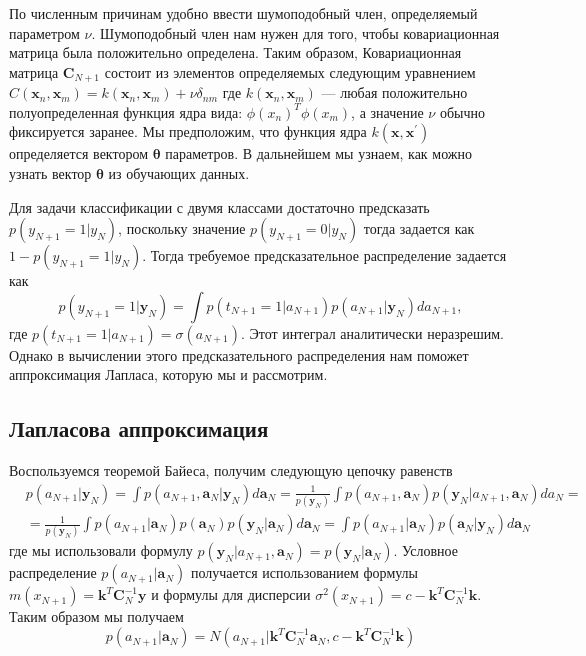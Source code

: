 {По численным причинам удобно ввести шумоподобный член, определяемый
параметром $\nu$. Шумоподобный член нам нужен для того, чтобы ковариационная матрица была положительно определена. Таким образом,
Ковариационная матрица $\mathbf{C}_{N+1}$ состоит из элементов определяемых следующим уравнением $C(\mathbf{x}_n,\mathbf{x}_m)=k(\mathbf{x}_n,\mathbf{x}_m)+\nu\delta_{nm}$
где $k(\mathbf{x}_n,\mathbf{x}_m)$ — любая положительно полуопределенная функция ядра вида: $\phi(x_n)^T\phi(x_m)$, а значение $\nu$ обычно фиксируется заранее. Мы предположим, что
функция ядра $k(\mathbf{x},\mathbf{x}^{\prime})$ определяется вектором $\mathbf{\theta}$ параметров. В дальнейшем мы узнаем, как можно узнать вектор $\mathbf{\theta}$ из обучающих данных.

Для задачи классификации с двумя классами достаточно предсказать $p(y_{N+1} =1|y_{N})$, поскольку
значение $p(y_{N+1} =0|y_{N})$ тогда задается как $1-p(y_{N+1} =1|y_{N})$. Тогда требуемое
предсказательное распределение задается как
\begin{equation}
p(y_{N+1} =1|\mathbf{y}_{N})= \int p(t_{N+1} =1|a_{N+1})p(a_{N+1}|\mathbf{y}_N)da_{N+1},
\end{equation}
где $p(t_{N+1} =1|a_{N+1})=\sigma(a_{N+1})$. Этот интеграл аналитически неразрешим. Однако в вычислении этого предсказательного распределения нам поможет аппроксимация Лапласа, которую мы и рассмотрим.

\subsection{Лапласова аппроксимация}
Воспользуемся теоремой Байеса, получим следующую цепочку равенств
\begin{equation}
\label{integral}
\begin{split}
&p(a_{N+1}|\mathbf{y}_{N}) = \int p(a_{N+1},\mathbf{a}_{N}|\mathbf{y}_N)d\mathbf{a}_{N}
= \frac{1}{p(\mathbf{y}_N)} \int p(a_{N+1},\mathbf{a}_{N})p(\mathbf{y}_{N}|a_{N+1},\mathbf{a}_{N})da_{N}= \\
&=\frac{1}{p(\mathbf{y}_{N})} \int p(a_{N+1}|\mathbf{a}_{N})p(\mathbf{a}_{N})p(\mathbf{y}_{N}|\mathbf{a}_{N})d\mathbf{a}_{N}= \int p(a_{N+1}|\mathbf{a}_{N})p(\mathbf{a}_{N}|\mathbf{y}_{N})d\mathbf{a}_{N}
\end{split}
\end{equation}
где мы использовали формулу $p(\mathbf{y}_{N}|a_{N+1},\mathbf{a}_{N})=p(\mathbf{y}_{N}|\mathbf{a}_{N})$. 
Условное распределение $p(a_{N+1}|\mathbf{a}_{N})$ получается использованием формулы  $m(x_{N+1}) = \mathbf{k}^T\mathbf{C}^{-1}_N\mathbf{y}$ и формулы для дисперсии $\sigma^2(x_{N+1}) = c-\mathbf{k}^T\mathbf{C}^{-1}_N\mathbf{k}$. Таким образом мы получаем
\[
\label{condition}
p(a_{N+1}|\mathbf{a}_{N})=N(a_{N+1}|\mathbf{k}^T\mathbf{C}^
{-1}_N\mathbf{a}_{N},c-\mathbf{k}^T\mathbf{C}^{-1}_N\mathbf{k})\]

}
